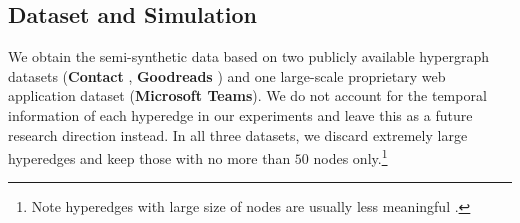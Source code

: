 


\subsection{Dataset and Simulation}
We obtain the semi-synthetic data based on two publicly available hypergraph datasets (\textbf{Contact} \cite{mastrandrea2015contact,benson2018simplicial}, \textbf{Goodreads} \cite{wan2018item,wan2019fine}) and one large-scale proprietary web application dataset (\textbf{Microsoft Teams}).
We do not account for the temporal information of each hyperedge in our experiments and leave this as a future research direction instead.
In all three datasets, we discard extremely large hyperedges and keep those with no more than $50$ nodes only.\footnote{Note hyperedges with large size of nodes are usually less meaningful \cite{benson2018simplicial}.} 


